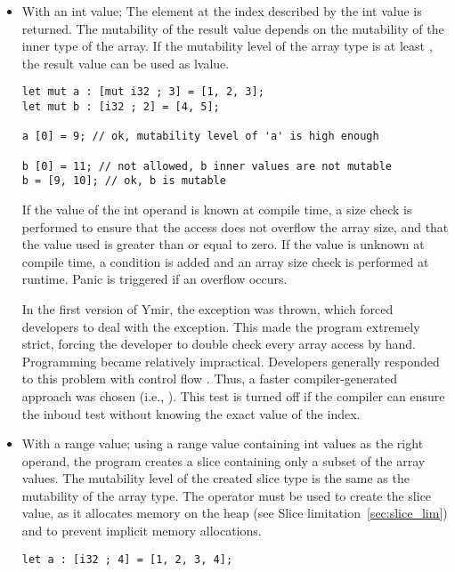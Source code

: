 \begin{itemize}
  \setlength\itemsep{-4pt}
\item With an int value; The element at the index described by the int value is
  returned. The mutability of the result value depends on the mutability of the
  inner type of the array. If the mutability level of the array type is at least
  , the result value can be used as lvalue.

  \begin{lstlisting}[style=coloredverbatim]
let mut a : [mut i32 ; 3] = [1, 2, 3];
let mut b : [i32 ; 2] = [4, 5];

a [0] = 9; // ok, mutability level of 'a' is high enough

b [0] = 11; // not allowed, b inner values are not mutable
b = [9, 10]; // ok, b is mutable
  \end{lstlisting}

  If the value of the int operand is known at compile time, a size check is
  performed to ensure that the access does not overflow the array size, and that
  the value used is greater than or equal to zero. If the value is unknown at
  compile time, a condition is added and an array size check is performed at
  runtime. Panic is triggered if an overflow occurs.

  In the first version of Ymir, the exception
   was thrown, which forced developers to
  deal with the exception. This made the program extremely strict, forcing the
  developer to double check every array access by hand. Programming became
  relatively impractical. Developers generally responded to this problem with
  control flow . Thus, a faster
  compiler-generated approach was chosen (i.e., ). This
  test is turned off if the compiler can ensure the inboud test without knowing
  the exact value of the index.

\item With a range value; using a range value containing int values as the right
  operand, the program creates a slice containing only a subset of the array
  values. The mutability level of the created slice type is the same as the
  mutability of the array type. The  operator must be used to create
  the slice value, as it allocates memory on the heap (see Slice
  limitation~\ref{sec:slice_lim}) and to prevent implicit memory allocations.

  \begin{lstlisting}[style=coloredverbatim]
let a : [i32 ; 4] = [1, 2, 3, 4];


\end{lstlisting}
\end{itemize}
